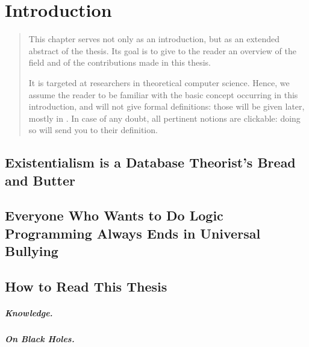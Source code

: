 \chapter{Introduction}

\begin{chapterpresentation}
	\begin{abstract}
		This chapter serves not only as an introduction, but as an extended
		abstract of the thesis. Its goal is to give to the reader an overview
		of the field and of the contributions made in this thesis.
		
		It is targeted at researchers in theoretical computer science.
		Hence, we assume the reader to be familiar with the basic concept occurring in
		this introduction, and will not give formal definitions: those
		will be given later, mostly in .
		In case of any doubt, all pertinent notions are clickable: doing so
		will send you to their definition.
	\end{abstract}
\end{chapterpresentation}

\chaptertoc



\section{Existentialism is a Database Theorist's Bread and Butter}

\section{Everyone Who Wants to Do Logic Programming Always Ends in Universal Bullying}


\section{How to Read This Thesis}

\paragraph*{Knowledge.}

\paragraph*{On Black Holes.}
